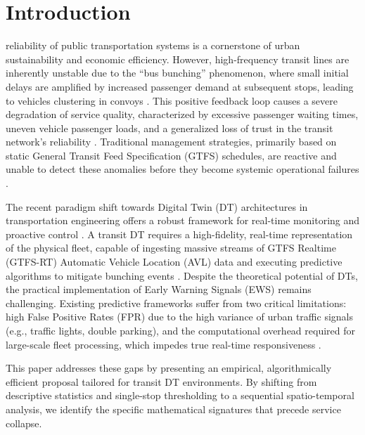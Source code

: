 \documentclass[journal,twocolumn]{IEEEtran}
\begin{document}
\section{Introduction}
 reliability of public transportation systems is a cornerstone of urban sustainability and economic efficiency. However, high-frequency transit lines are inherently unstable due to the ``bus bunching'' phenomenon, where small initial delays are amplified by increased passenger demand at subsequent stops, leading to vehicles clustering in convoys \cite{1,2}. This positive feedback loop causes a severe degradation of service quality, characterized by excessive passenger waiting times, uneven vehicle passenger loads, and a generalized loss of trust in the transit network's reliability \cite{3}. Traditional management strategies, primarily based on static General Transit Feed Specification (GTFS) schedules, are reactive and unable to detect these anomalies before they become systemic operational failures \cite{4}.

The recent paradigm shift towards Digital Twin (DT) architectures in transportation engineering offers a robust framework for real-time monitoring and proactive control \cite{5,6}. A transit DT requires a high-fidelity, real-time representation of the physical fleet, capable of ingesting massive streams of GTFS Realtime (GTFS-RT) Automatic Vehicle Location (AVL) data and executing predictive algorithms to mitigate bunching events \cite{7}. Despite the theoretical potential of DTs, the practical implementation of Early Warning Signals (EWS) remains challenging. Existing predictive frameworks suffer from two critical limitations: high False Positive Rates (FPR) due to the high variance of urban traffic signals (e.g., traffic lights, double parking), and the computational overhead required for large-scale fleet processing, which impedes true real-time responsiveness \cite{8,9}.

This paper addresses these gaps by presenting an empirical, algorithmically efficient proposal tailored for transit DT environments. By shifting from descriptive statistics and single-stop thresholding to a sequential spatio-temporal analysis, we identify the specific mathematical signatures that precede service collapse.
\end{document}
